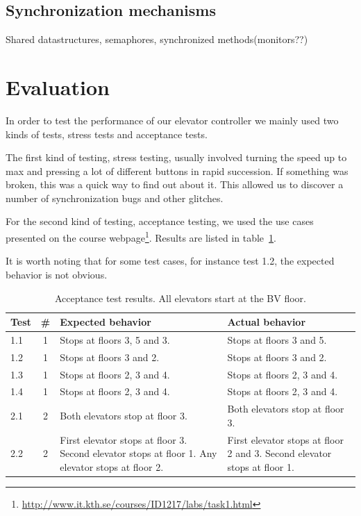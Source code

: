 \documentclass[a4paper]{article}
\begin{document}
\subsection{Synchronization mechanisms}
Shared datastructures, semaphores, synchronized methods(monitors??) 


\section{Evaluation}

In order to test the performance of our elevator controller we mainly used two
kinds of tests, stress tests and acceptance tests.

The first kind of testing, stress testing, usually involved turning the speed up
to max and pressing a lot of different buttons in rapid succession. If something
was broken, this was a quick way to find out about it. This allowed us to
discover a number of synchronization bugs and other glitches.

For the second kind of testing, acceptance testing, we used the use cases
presented on the course
webpage\footnote{\url{http://www.it.kth.se/courses/ID1217/labs/task1.html}}.
Results are listed in table~\ref{tab:acceptance_test_results}.

It is worth noting that for some test cases, for instance test 1.2, the expected
behavior is not obvious.

\begin{table}[h]
    \begin{tabular}{| l | c | p{4.7cm} | p{4.7cm} |}
        \hline
        Test & \# & Expected behavior & Actual behavior \\
        \hline
        1.1 & 1 &
            Stops at floors 3, 5 and 3. &
            Stops at floors 3 and 5. \\
        1.2 & 1 &
            Stops at floors 3 and 2. &
            Stops at floors 3 and 2. \\
        1.3 & 1 &
            Stops at floors 2, 3 and 4. &
            Stops at floors 2, 3 and 4. \\
        1.4 & 1 &
            Stops at floors 2, 3 and 4. &
            Stops at floors 2, 3 and 4. \\
        2.1 & 2 &
            Both elevators stop at floor 3. &
            Both elevators stop at floor 3. \\ %
        2.2 & 2 &
            First elevator stops at floor 3.
                Second elevator stops at floor 1.
                Any elevator stops at floor 2. &
            First elevator stops at floor 2 and 3.
                Second elevator stops at floor 1. \\
        \hline
    \end{tabular}
    \caption{Acceptance test results. All elevators start at the BV floor.}
    \label{tab:acceptance_test_results}
\end{table}
\end{document}
